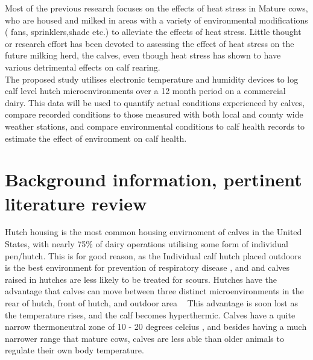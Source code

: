 \documentclass[12pt]{article}
\begin{document}
	Most of the previous research focuses on the effects of heat stress in Mature cows, who are housed and milked in areas with a variety of environmental modifications ( fans, sprinklers,shade etc.)  to alleviate the effects of heat stress.\cite{Armstrong1994}
	Little thought or research effort has been devoted to assessing the effect of heat stress on the future milking herd, the calves, even though heat stress has shown to have various detrimental effects on calf rearing. \cite{Stott1976,lacetera1994}\\


	The proposed study utilises electronic temperature and humidity devices to log calf level hutch microenvironments over a 12 month period on a commercial dairy. This data will be used to quantify actual conditions experienced by calves, compare recorded conditions to those measured with both local and county wide weather stations, and compare environmental conditions to calf health records to estimate the effect of environment on calf health. 

	\newpage
	\section{Background information, pertinent literature review}
	Hutch housing is the most common housing envirnoment of calves in the United States, with nearly 75\% of dairy operations utilising some form of individual pen/hutch.\cite{NAHMS2007}
	This is for good reason, as the Individual calf hutch placed outdoors is the best environment for prevention of respiratory disease \cite{callan2002biosecurity}, and and calves raised in hutches are less likely to be treated for scours. \cite{Waltner-Toews1986}
	Hutches have the advantage that calves can move between three distinct microenvironments in the rear of hutch, front of hutch, and outdoor area ~\cite{brunsvold1985} 
	This advantage is soon lost as the temperature rises, and the calf becomes hyperthermic. Calves have a quite narrow thermoneutral zone of 10 - 20 degrees celcius \cite{Gebremedhin1981}, and besides having a much narrower range that mature cows, calves are less able than older animals to regulate their own body temperature.\cite{Christopherson1976}\\
\end{document}
